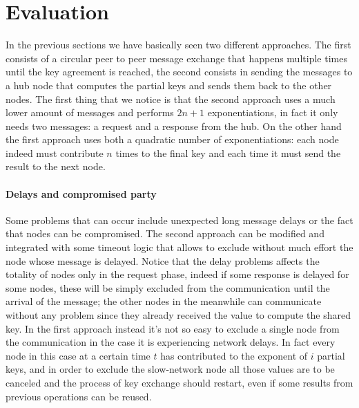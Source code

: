 \documentclass[11pt]{article}
\begin{document}
\section{Evaluation}
In the previous sections we have basically seen two different approaches. The first consists of a circular peer to peer message exchange that happens multiple times until the key agreement is reached, the second consists in sending the messages to a hub node that computes the partial keys and sends them back to the other nodes. The first thing that we notice is that the second approach uses a much lower amount of messages and performs $2n + 1$ exponentiations, in fact it only needs two messages: a request and a response from the hub. On the other hand the first approach uses both a quadratic number of exponentiations: each node indeed must contribute $n$ times to the final key and each time it must send the result to the next node.
\paragraph*{Delays and compromised party}
Some problems that can occur include unexpected long message delays or the fact that nodes can be compromised. The second approach can be modified and integrated with some timeout logic that allows to exclude without much effort the node whose message is delayed. Notice that the delay problems affects the totality of nodes only in the request phase, indeed if some response is delayed for some nodes, these will be simply excluded from the communication until the arrival of the message; the other nodes in the meanwhile can communicate without any problem since they already received the value to compute the shared key. In the first approach instead it's not so easy to exclude a single node from the communication in the case it is experiencing network delays. In fact every node in this case at a certain time $t$ has contributed to the exponent of $i$ partial keys, and in order to exclude the slow-network node all those values are to be canceled and the process of key exchange should restart, even if some results from previous operations can be reused.
\end{document}

